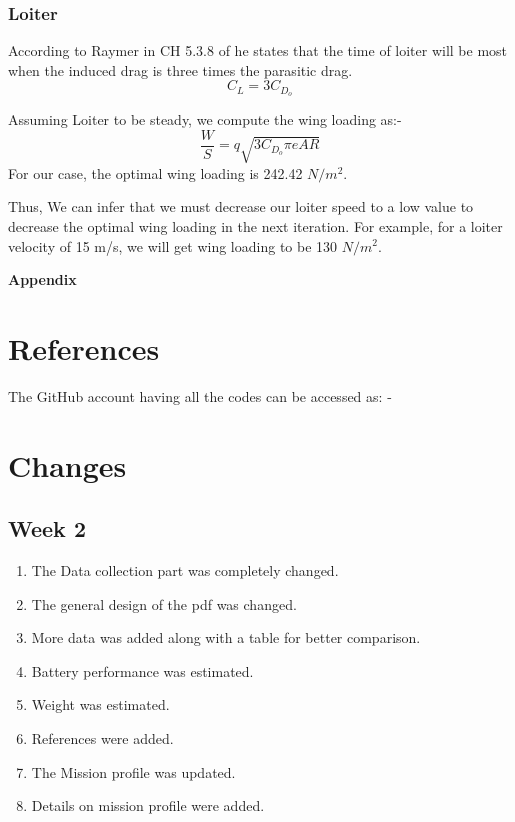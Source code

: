 \documentclass[12 pt]{article}
\begin{document}
\subsubsection{Loiter}

According to Raymer in CH 5.3.8 of \cite{Raymer.2006} he states that the time of loiter will be most when the induced drag is three times the parasitic drag. 
$$C_L = 3 C_{D_o}$$

Assuming Loiter to be steady, we compute the wing loading as:-
$$\frac{W}{S} = q \sqrt{3C_{D_o} \pi e AR}$$
For our case, the optimal wing loading is 242.42 $N/m^2$.

Thus, We can infer that we must decrease our loiter speed to a low value to decrease the optimal wing loading in the next iteration. For example, for a loiter velocity of 15 m/s, we will get wing loading to be 130 $N/m^2$.

\newpage
\textbf{\Huge{Appendix}}
\appendix


\section{References}




\vspace{10 pt}

The GitHub account having all the codes can be accessed as: - 

\href{https://github.com/abhijeetmangela/Group_7_design.git}{}

\newpage

\section{Changes}

\subsection{Week 2}
\begin{enumerate}
    \item The Data collection part was completely changed.
    \item The general design of the pdf was changed.
    \item More data was added along with a table for better comparison.
    \item Battery performance was estimated.
    \item Weight was estimated.
    \item References were added.
    \item The Mission profile was updated.
    \item Details on mission profile were added.
\end{enumerate}
\end{document}
